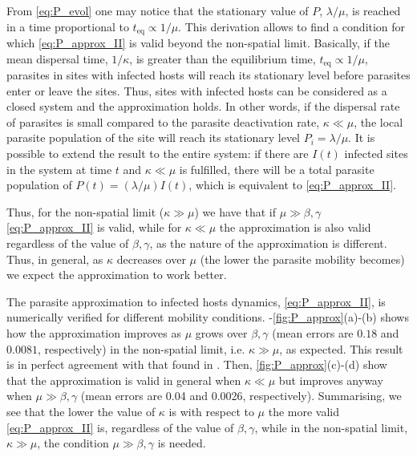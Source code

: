 From \cref{eq:P_evol} one may notice that the stationary value of $P$,
$\lambda/\mu$, is reached in a time proportional to $t_{\textrm{eq}}\propto
    1/\mu$. This derivation allows to find a condition for which
\cref{eq:P_approx_II}
is valid beyond the non-spatial limit. Basically, if the mean dispersal time,
$1/\kappa$, is greater than the equilibrium time, $t_{\textrm{eq}}\propto
    1/\mu$, parasites in sites with infected hosts will reach its stationary
level
before parasites enter or leave the sites. Thus, sites with infected hosts can
be considered as a closed system and the approximation holds. In other words,
if the dispersal rate of parasites is small compared to the parasite
deactivation rate, $\kappa \ll \mu$, the local parasite population of the site
will reach its stationary level $P_i=\lambda/\mu$. It is possible to extend the
result to the entire system: if there are $I(t)$ infected sites in the system
at time $t$ and $\kappa\ll\mu$ is fulfilled, there will be a total parasite
population of $P(t)=(\lambda/\mu) I(t)$, which is equivalent to
\cref{eq:P_approx_II}.

Thus, for the non-spatial limit ($\kappa\gg\mu$) we have that if
$\mu\gg\beta,\gamma$ \cref{eq:P_approx_II} is valid, while for $\kappa\ll\mu$
the
approximation is also valid regardless of the value of $\beta,\gamma$, as the
nature of the approximation is different. Thus, in general, as $\kappa$
decreases over $\mu$ (the lower the parasite mobility becomes) we expect the
approximation to work better.

The parasite approximation to infected hosts dynamics, \cref{eq:P_approx_II},
is numerically verified for different mobility conditions.
-\cref{fig:P_approx}(a)-(b) shows how the approximation improves as $\mu$ grows
over $\beta,\gamma$ (mean errors are $0.18$ and $0.0081$, respectively) in the
non-spatial limit, i.e. $\kappa\gg\mu$, as expected. This result is in perfect
agreement with that found in \cite{GimenezRomero2021}. Then,
\cref{fig:P_approx}(c)-(d) show that the approximation is valid in general when
$\kappa\ll\mu$ but improves anyway when $\mu\gg\beta,\gamma$ (mean errors are
0.04 and 0.0026, respectively). Summarising, we see that the lower the value of
$\kappa$ is with respect to $\mu$ the more valid \cref{eq:P_approx_II} is,
regardless of the value of $\beta,\gamma$, while in the non-spatial limit,
$\kappa\gg\mu$, the condition $\mu\gg\beta,\gamma$ is needed.

